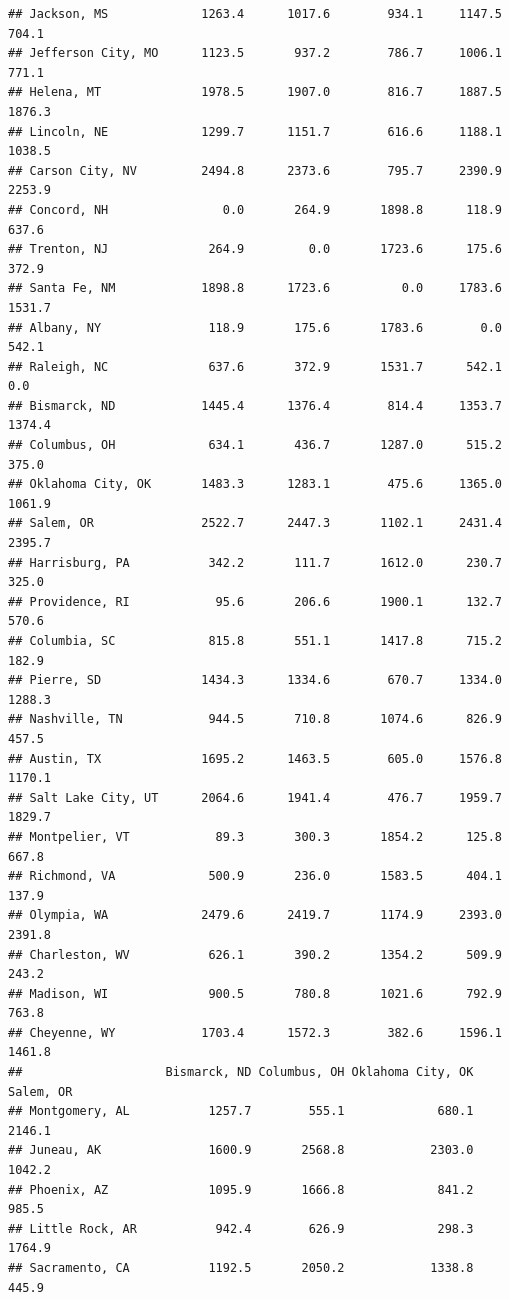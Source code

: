 \documentclass[
]{article}
\begin{document}
\begin{verbatim}
## Jackson, MS             1263.4      1017.6        934.1     1147.5       704.1
## Jefferson City, MO      1123.5       937.2        786.7     1006.1       771.1
## Helena, MT              1978.5      1907.0        816.7     1887.5      1876.3
## Lincoln, NE             1299.7      1151.7        616.6     1188.1      1038.5
## Carson City, NV         2494.8      2373.6        795.7     2390.9      2253.9
## Concord, NH                0.0       264.9       1898.8      118.9       637.6
## Trenton, NJ              264.9         0.0       1723.6      175.6       372.9
## Santa Fe, NM            1898.8      1723.6          0.0     1783.6      1531.7
## Albany, NY               118.9       175.6       1783.6        0.0       542.1
## Raleigh, NC              637.6       372.9       1531.7      542.1         0.0
## Bismarck, ND            1445.4      1376.4        814.4     1353.7      1374.4
## Columbus, OH             634.1       436.7       1287.0      515.2       375.0
## Oklahoma City, OK       1483.3      1283.1        475.6     1365.0      1061.9
## Salem, OR               2522.7      2447.3       1102.1     2431.4      2395.7
## Harrisburg, PA           342.2       111.7       1612.0      230.7       325.0
## Providence, RI            95.6       206.6       1900.1      132.7       570.6
## Columbia, SC             815.8       551.1       1417.8      715.2       182.9
## Pierre, SD              1434.3      1334.6        670.7     1334.0      1288.3
## Nashville, TN            944.5       710.8       1074.6      826.9       457.5
## Austin, TX              1695.2      1463.5        605.0     1576.8      1170.1
## Salt Lake City, UT      2064.6      1941.4        476.7     1959.7      1829.7
## Montpelier, VT            89.3       300.3       1854.2      125.8       667.8
## Richmond, VA             500.9       236.0       1583.5      404.1       137.9
## Olympia, WA             2479.6      2419.7       1174.9     2393.0      2391.8
## Charleston, WV           626.1       390.2       1354.2      509.9       243.2
## Madison, WI              900.5       780.8       1021.6      792.9       763.8
## Cheyenne, WY            1703.4      1572.3        382.6     1596.1      1461.8
##                    Bismarck, ND Columbus, OH Oklahoma City, OK Salem, OR
## Montgomery, AL           1257.7        555.1             680.1    2146.1
## Juneau, AK               1600.9       2568.8            2303.0    1042.2
## Phoenix, AZ              1095.9       1666.8             841.2     985.5
## Little Rock, AR           942.4        626.9             298.3    1764.9
## Sacramento, CA           1192.5       2050.2            1338.8     445.9

\end{verbatim}
\end{document}
